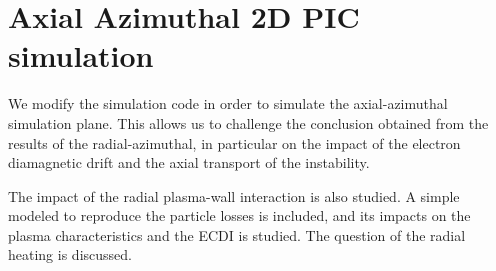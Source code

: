 



\chapter{Axial Azimuthal 2D PIC simulation}
\label{ch-6}


\begin{Chabstract}
  We modify the simulation code \LPPic in order to simulate the axial-azimuthal simulation plane.
  This allows us to challenge the conclusion obtained from the results of the radial-azimuthal, in particular on the impact of the electron diamagnetic drift and the axial transport of the instability.
  
  The impact of the radial plasma-wall interaction is also studied.
  A simple modeled to reproduce the particle losses is included, and its impacts on the plasma characteristics and the \ac{ECDI} is studied.
  The question of the radial heating is discussed. 
\end{Chabstract}

\renewcommand\subfigurewidth{0.45\textwidth}

% 
% 

\minitoc



% 





